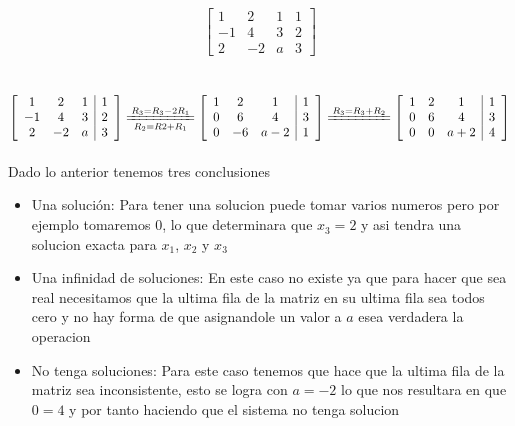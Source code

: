 \documentclass[a4paper,12pt]{article}
\begin{document}
    \[
        \left[\begin{array}{ccc|c}
        1 & 2 & 1 & 1 \\
        -1 & 4 & 3 & 2 \\
        2 & -2 & a & 3 
        \end{array}\right] 
    \] \\  \\  


    \( 
        \left[\begin{array}{ccc|c}
        1 & 2 & 1 & 1 \\
        -1 & 4 & 3 & 2 \\
        2 & -2 & a & 3 
        \end{array}\right] 
        \xlongequal[R_2 = R2+R_1]{R_3=R_3 - 2R_1}
        \left[\begin{array}{ccc|c}
        1 & 2 & 1 & 1 \\
        0 & 6 & 4 & 3 \\
        0 & -6 & a-2 & 1 
        \end{array}\right] 
        \xlongequal[]{R_3=R_3 + R_2}
        \left[\begin{array}{ccc|c}
        1 & 2 & 1 & 1 \\
        0 & 6 & 4 & 3 \\
        0 & 0 & a+2 & 4 
        \end{array}\right] 
    \) \\ \\

    Dado lo anterior tenemos tres conclusiones

    \begin{itemize}[label=$\bullet$]
      \item  Una solución: Para tener una solucion puede tomar varios numeros pero por ejemplo tomaremos 0, lo que determinara que \(x_3 = 2\) y asi tendra una solucion exacta para \(x_1\), \(x_2\) y \(x_3\)    
      \item Una infinidad de soluciones:
      En este caso no existe ya que para hacer que sea real necesitamos que la ultima fila de la matriz en su ultima fila sea todos cero y no hay forma de que asignandole un valor a \(a\) esea verdadera la operacion
      
      \item No tenga soluciones: Para este caso tenemos que hace que la ultima fila de la matriz sea inconsistente, esto se logra con \(a = -2\) lo que nos resultara en que \(0= 4 \) y por tanto haciendo que el sistema no tenga solucion
    \end{itemize}
\end{document}
